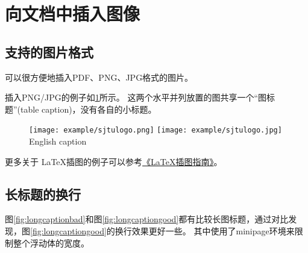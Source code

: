 \section{向文档中插入图像}
\label{sec:insertimage}

\subsection{支持的图片格式}
\label{sec:imageformat}

\XeTeX 可以很方便地插入PDF、PNG、JPG格式的图片。

插入PNG/JPG的例子如\ref{fig:SRR}所示。
这两个水平并列放置的图共享一个“图标题”(table caption)，没有各自的小标题。

\begin{figure}[!htp]
  \centering
  \texttt{[image: example/sjtulogo.png]}
  \hspace{1cm}
  \texttt{[image: example/sjtulogo.jpg]}
    {English caption}
  \label{fig:SRR}
\end{figure}

% 

更多关于 \LaTeX 插图的例子可以参考\href{http://www.cs.duke.edu/junhu/Graphics3.pdf}{《\LaTeX 插图指南》}。

\subsection{长标题的换行}
\label{sec:longcaption}

图\ref{fig:longcaptionbad}和图\ref{fig:longcaptiongood}都有比较长图标题，通过对比发现，图\ref{fig:longcaptiongood}的换行效果更好一些。
其中使用了minipage环境来限制整个浮动体的宽度。

